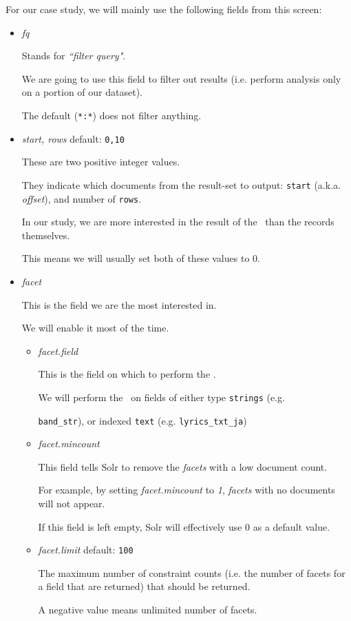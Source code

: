 \bigskip

For our case study, we will mainly use the following fields from this screen:
\begin{itemize}
	\item \emph{fq}
	
	Stands for \emph{``filter query"}.
	
	We are going to use this field to filter out results (i.e. perform analysis only on a portion of our dataset).
	
	The default (\texttt{*:*}) does not filter anything.
	
	
	\item \emph{start, rows} \hfill default: \texttt{0,10}
	
	These are two positive integer values.
	
	They indicate which documents from the result-set to output: \texttt{start} (a.k.a. \emph{offset}), and number of \texttt{rows}.
	
	In our study, we are more interested in the result of the \faceting\ than the records themselves. 
	
	This means we will usually set both of these values to 0.
	
	\item \emph{facet}
	
	This is the field we are the most interested in.
	
	We will enable it most of the time.
	
	\begin{itemize}
		\item \emph{facet.field}
		
		This is the field on which to perform the \faceting.
		
		We will perform the \faceting\ on fields of either type \texttt{strings} (e.g. 
		
		\texttt{band\_str}), or indexed \texttt{text} (e.g. \texttt{lyrics\_txt\_ja})
		
		
		\item \emph{facet.mincount}  %
			
		This field tells Solr to remove the \emph{facets} with a low document count. 
		
		For example, by setting \emph{facet.mincount} to \emph{1}, \emph{facets} with no documents will not appear.
		
		If this field is left empty, Solr will effectively use 0 as a default value.
		
		\item \emph{facet.limit}   \hfill default: \texttt{100}
		
		The maximum number of constraint counts (i.e. the number of facets for a field that are returned) that should be returned.
		
		A negative value means unlimited number of facets. 
		
		
	\end{itemize}
\end{itemize}


